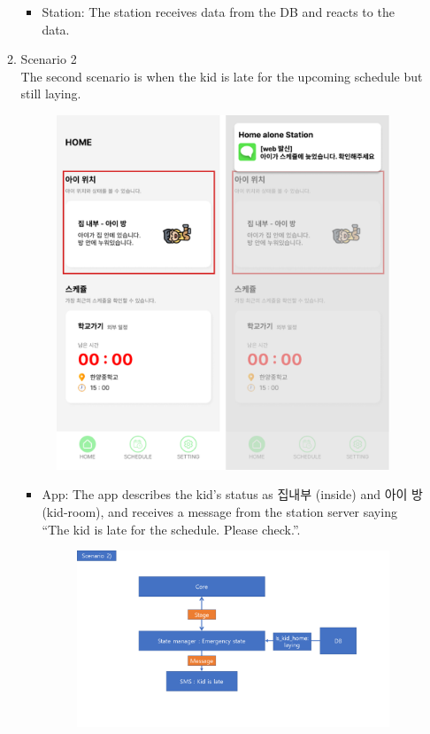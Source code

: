 \documentclass[conference]{IEEEtran}
\begin{document}
\begin{enumerate}[label=\arabic*.]
\begin{enumerate}[label=\arabic*.]
\begin{itemize}
        \item Station: The station receives data from the DB and reacts to the data. \\
    \end{itemize}
    \item {\large{Scenario 2}} \\
    The second scenario is when the kid is late for the upcoming schedule but still laying. \\
    \begin{figure}[H]\centering\includegraphics[scale=0.4]{images/scenario2.png}\end{figure} 
    \begin{itemize}
        \item App: The app describes the kid’s status as 집내부 (inside) and 아이 방 (kid-room), and receives a message from the station server saying “The kid is late for the schedule. Please check.”.\\
        \begin{figure}[H]\centering\includegraphics[scale=0.3]{images/s2.png}\end{figure}

\end{itemize}
\end{enumerate}
\end{enumerate}
\end{document}

